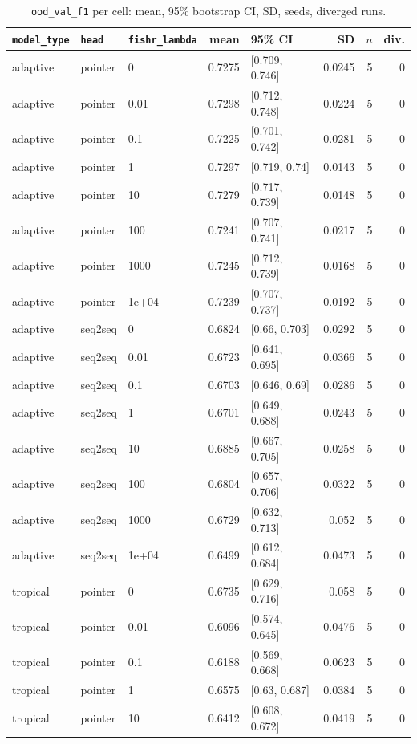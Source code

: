 \documentclass[10pt]{article}
\begin{document}
{\small
\begin{longtable}{lllrlrrr}
\caption{\texttt{ood\_val\_f1} per cell: mean, 95\% bootstrap CI, SD, seeds, diverged runs.}\label{tab:summary-ood_val_f1}\\
\toprule
\texttt{model\_type} & \texttt{head} & \texttt{fishr\_lambda} & mean & 95\% CI & SD & $n$ & div.\\
\midrule
\endhead
adaptive & pointer & 0 & 0.7275 & [0.709, 0.746] & 0.0245 & 5 & 0\\
adaptive & pointer & 0.01 & 0.7298 & [0.712, 0.748] & 0.0224 & 5 & 0\\
adaptive & pointer & 0.1 & 0.7225 & [0.701, 0.742] & 0.0281 & 5 & 0\\
adaptive & pointer & 1 & 0.7297 & [0.719, 0.74] & 0.0143 & 5 & 0\\
adaptive & pointer & 10 & 0.7279 & [0.717, 0.739] & 0.0148 & 5 & 0\\
adaptive & pointer & 100 & 0.7241 & [0.707, 0.741] & 0.0217 & 5 & 0\\
adaptive & pointer & 1000 & 0.7245 & [0.712, 0.739] & 0.0168 & 5 & 0\\
adaptive & pointer & 1e+04 & 0.7239 & [0.707, 0.737] & 0.0192 & 5 & 0\\
adaptive & seq2seq & 0 & 0.6824 & [0.66, 0.703] & 0.0292 & 5 & 0\\
adaptive & seq2seq & 0.01 & 0.6723 & [0.641, 0.695] & 0.0366 & 5 & 0\\
adaptive & seq2seq & 0.1 & 0.6703 & [0.646, 0.69] & 0.0286 & 5 & 0\\
adaptive & seq2seq & 1 & 0.6701 & [0.649, 0.688] & 0.0243 & 5 & 0\\
adaptive & seq2seq & 10 & 0.6885 & [0.667, 0.705] & 0.0258 & 5 & 0\\
adaptive & seq2seq & 100 & 0.6804 & [0.657, 0.706] & 0.0322 & 5 & 0\\
adaptive & seq2seq & 1000 & 0.6729 & [0.632, 0.713] & 0.052 & 5 & 0\\
adaptive & seq2seq & 1e+04 & 0.6499 & [0.612, 0.684] & 0.0473 & 5 & 0\\
tropical & pointer & 0 & 0.6735 & [0.629, 0.716] & 0.058 & 5 & 0\\
tropical & pointer & 0.01 & 0.6096 & [0.574, 0.645] & 0.0476 & 5 & 0\\
tropical & pointer & 0.1 & 0.6188 & [0.569, 0.668] & 0.0623 & 5 & 0\\
tropical & pointer & 1 & 0.6575 & [0.63, 0.687] & 0.0384 & 5 & 0\\
tropical & pointer & 10 & 0.6412 & [0.608, 0.672] & 0.0419 & 5 & 0\\

\end{longtable}}
\end{document}
